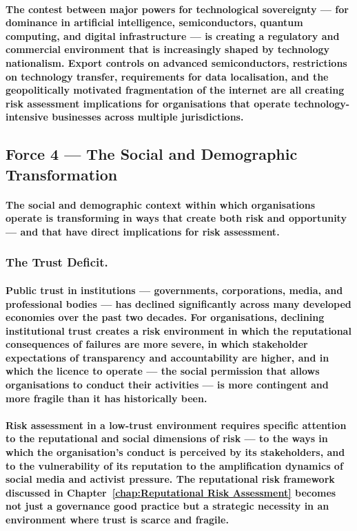 \paragraph{The contest between major powers for technological sovereignty — for dominance in artificial intelligence, semiconductors, quantum computing, and digital infrastructure — is creating a regulatory and commercial environment that is increasingly shaped by technology nationalism. Export controls on advanced semiconductors, restrictions on technology transfer, requirements for data localisation, and the geopolitically motivated fragmentation of the internet are all creating risk assessment implications for organisations that operate technology-intensive businesses across multiple jurisdictions.}

\subsection{Force 4 — The Social and Demographic Transformation}
\paragraph{The social and demographic context within which organisations operate is transforming in ways that create both risk and opportunity — and that have direct implications for risk assessment.}
\subsubsection{The Trust Deficit.}
\paragraph{Public trust in institutions — governments, corporations, media, and professional bodies — has declined significantly across many developed economies over the past two decades. For organisations, declining institutional trust creates a risk environment in which the reputational consequences of failures are more severe, in which stakeholder expectations of transparency and accountability are higher, and in which the licence to operate — the social permission that allows organisations to conduct their activities — is more contingent and more fragile than it has historically been.}
\paragraph{Risk assessment in a low-trust environment requires specific attention to the reputational and social dimensions of risk — to the ways in which the organisation's conduct is perceived by its stakeholders, and to the vulnerability of its reputation to the amplification dynamics of social media and activist pressure. The reputational risk framework discussed in Chapter~\ref{chap:Reputational Risk Assessment} becomes not just a governance good practice but a strategic necessity in an environment where trust is scarce and fragile.}
